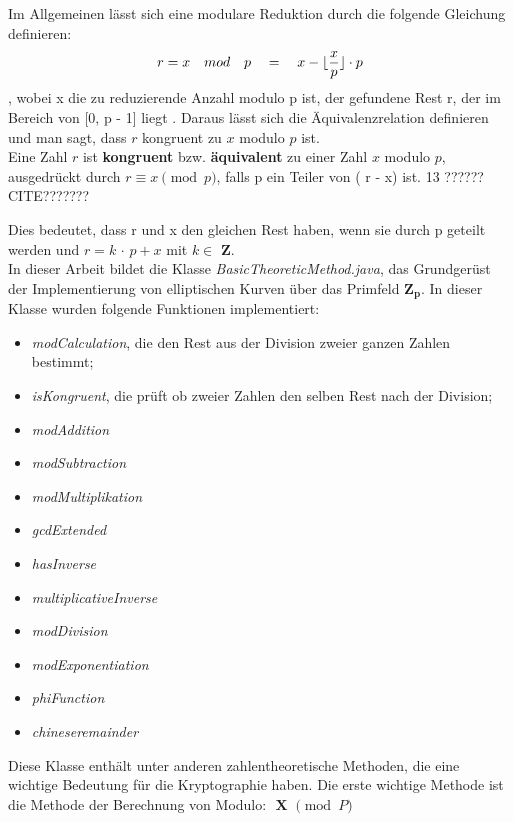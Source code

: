 Im Allgemeinen lässt sich eine modulare Reduktion durch die folgende Gleichung definieren: \[ r = x \quad mod \quad p \quad = \quad x - \lfloor\frac{x}{p}\rfloor \cdot p \], wobei x die zu reduzierende Anzahl modulo p ist, der gefundene Rest r, der im Bereich von [0, p - 1] liegt \cite{patent}. Daraus lässt sich die Äquivalenzrelation definieren und man sagt, dass $ r $ kongruent zu $ x $ modulo $ p $ ist.\\

Eine Zahl $ r $ ist \textbf{kongruent} bzw. \textbf{äquivalent} zu einer Zahl $ x $ modulo $ p $, ausgedrückt durch \( r \equiv x \pmod{p} \), falls p ein Teiler von ( r - x) ist. 
13 ?????? CITE???????


Dies bedeutet, dass r und x den gleichen Rest haben, wenn sie durch p geteilt werden und $ r = k $ $\cdot $ $ p + x $ mit  $ k \in $ $ \mathbf{Z} $.\\



In dieser Arbeit bildet  die Klasse \textit{BasicTheoreticMethod.java}, das Grundgerüst der Implementierung von elliptischen Kurven über das Primfeld $\mathbf{ Z_p} $. 
In dieser Klasse wurden folgende Funktionen implementiert:
\begin{itemize}
    \item \textit{modCalculation}, die den Rest aus der Division zweier ganzen Zahlen bestimmt; 
    \item \textit{isKongruent}, die prüft ob zweier Zahlen den selben Rest nach der Division;
    \item \textit{modAddition}
    \item \textit{modSubtraction}
    \item \textit{modMultiplikation}
    \item \textit{gcdExtended}
    \item \textit{hasInverse}
    \item \textit{multiplicativeInverse}
    \item \textit{modDivision}
    \item \textit{modExponentiation}
    \item \textit{phiFunction}
    \item \textit{chineseremainder}
\end{itemize}

Diese Klasse enthält unter anderen zahlentheoretische Methoden, die eine wichtige Bedeutung für die Kryptographie haben.
Die erste wichtige Methode ist die Methode der Berechnung von Modulo: $\textbf{ X $\pmod P $} $

